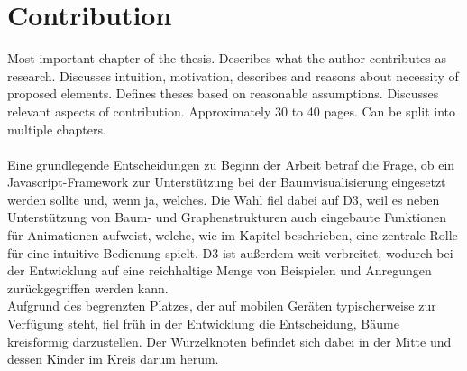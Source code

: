 \chapter{Contribution}

Most important chapter of the thesis. Describes what the author contributes as research. Discusses intuition, motivation, describes and reasons about necessity of proposed elements. Defines theses based on reasonable assumptions. Discusses relevant aspects of contribution. Approximately 30 to 40 pages. Can be split into multiple chapters.
\\\\
Eine grundlegende Entscheidungen zu Beginn der Arbeit betraf die Frage, ob ein Javascript-Framework zur Unterstützung bei der Baumvisualisierung eingesetzt werden sollte und, wenn ja, welches. Die Wahl fiel dabei auf D3, weil es neben Unterstützung von Baum- und Graphenstrukturen auch eingebaute Funktionen für Animationen aufweist, welche, wie im Kapitel  beschrieben, eine zentrale Rolle für eine intuitive Bedienung spielt. D3 ist außerdem weit verbreitet, wodurch bei der Entwicklung auf eine reichhaltige Menge von Beispielen und Anregungen zurückgegriffen werden kann. 
\\
Aufgrund des begrenzten Platzes, der auf mobilen Geräten typischerweise zur Verfügung steht, fiel früh in der Entwicklung die Entscheidung, Bäume kreisförmig darzustellen. Der Wurzelknoten befindet sich dabei in der Mitte und dessen Kinder im Kreis darum herum.
